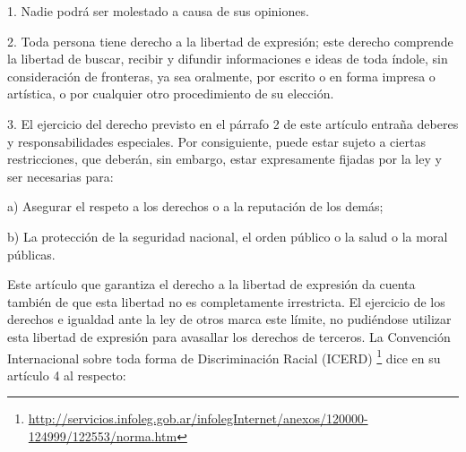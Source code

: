 \begin{displayquote}
1. Nadie podrá ser molestado a causa de sus opiniones.

2. Toda persona tiene derecho a la libertad de expresión; este derecho comprende la libertad de buscar, recibir y difundir informaciones e ideas de toda índole, sin consideración de fronteras, ya sea oralmente, por escrito o en forma impresa o artística, o por cualquier otro procedimiento de su elección.

3. El ejercicio del derecho previsto en el párrafo 2 de este artículo entraña deberes y responsabilidades especiales. Por consiguiente, puede estar sujeto a ciertas restricciones, que deberán, sin embargo, estar expresamente fijadas por la ley y ser necesarias para:

a) Asegurar el respeto a los derechos o a la reputación de los demás;

b) La protección de la seguridad nacional, el orden público o la salud o la moral públicas.
\end{displayquote}

Este artículo que garantiza el derecho a la libertad de expresión da cuenta también de que esta libertad no es completamente irrestricta. El ejercicio de los derechos e igualdad ante la ley de otros marca este límite, no pudiéndose utilizar esta libertad de expresión para avasallar los derechos de terceros. La Convención Internacional sobre toda forma de Discriminación Racial (ICERD) \footnote{\url{http://servicios.infoleg.gob.ar/infolegInternet/anexos/120000-124999/122553/norma.htm}} dice en su artículo 4 al respecto:


